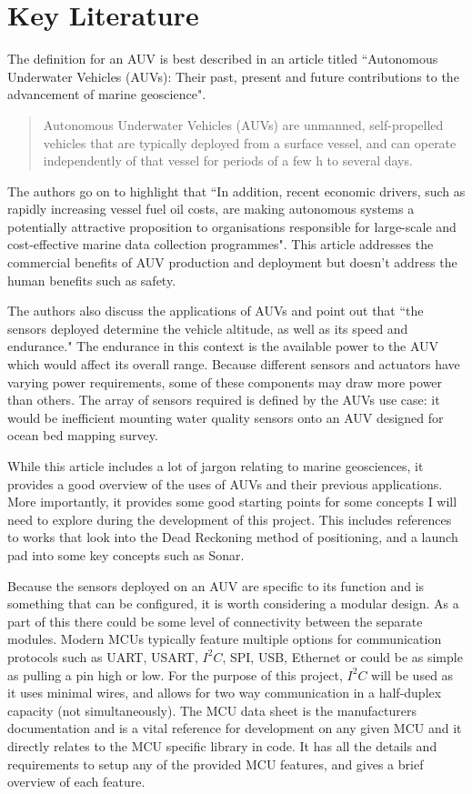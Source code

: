 \documentclass[11pt,a4paper,titlepage]{report}
\begin{document}
	\section*{Key Literature}
	The definition for an AUV is best described in an article titled ``Autonomous Underwater Vehicles (AUVs): Their past, present and future contributions to the advancement of marine geoscience". 
	
	\begin{quote}
		Autonomous Underwater Vehicles (AUVs) are unmanned, self-propelled vehicles that are typically deployed from a surface vessel, and can operate independently of that vessel for periods of a few h to several days.\cite{AUV_PPF}
	\end{quote}
	
	The authors go on to highlight that ``In addition, recent economic drivers, such as rapidly increasing vessel fuel oil costs, are making autonomous systems a potentially attractive proposition to organisations responsible for large-scale and cost-effective marine data collection programmes"\cite{AUV_PPF}. This article addresses the commercial benefits of AUV production and deployment but doesn't address the human benefits such as safety. 
	
	The authors also discuss the applications of AUVs and point out that ``the sensors deployed determine the vehicle altitude, as well as its speed and endurance."\cite{AUV_PPF} The endurance in this context is the available power to the AUV which would affect its overall range. Because different sensors and actuators have varying power requirements, some of these components may draw more power than others. The array of sensors required is defined by the AUVs use case: it would be inefficient mounting water quality sensors onto an AUV designed for ocean bed mapping survey. 
	
	While this article includes a lot of jargon relating to marine geosciences, it provides a good overview of the uses of AUVs and their previous applications. More importantly, it provides some good starting points for some concepts I will need to  explore during the development of this project. This includes references to works that look into the Dead Reckoning method of positioning, and a launch pad into some key concepts such as Sonar. 

	Because the sensors deployed on an AUV are specific to its function and is something that can be configured, it is worth considering a modular design. As a part of this there could be some level of connectivity between the separate modules. Modern MCUs typically feature multiple options for communication protocols such as UART, USART, $I^{2}C$, SPI, USB, Ethernet or could be as simple as pulling a pin high or low. For the purpose of this project, $I^{2}C$ will be used as it uses minimal wires, and allows for two way communication in a half-duplex capacity (not simultaneously). The MCU data sheet\cite{ATTINY1627} is the manufacturers documentation and is a vital reference for development on any given  MCU and it directly relates to the MCU specific library in code. It has all the details and requirements to setup any of the provided MCU features, and gives a brief overview of each feature. 
	
\end{document}
